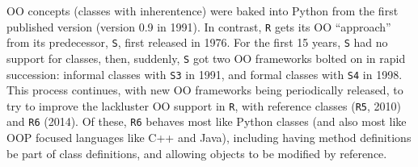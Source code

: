\documentclass[12pt, krantz2,]{krantz}
\theoremstyle{definition}
\theoremstyle{definition}
\theoremstyle{definition}
\newcommand{\1}{\mathbbm{1}}
\begin{document}
OO concepts (classes with inherentence) were baked into Python from the first
published version (version 0.9 in 1991). In contrast, \texttt{R} gets its OO ``approach''
from its predecessor, \texttt{S}, first released in 1976. For the first 15 years, \texttt{S}
had no support for classes, then, suddenly, \texttt{S} got two OO frameworks bolted on
in rapid succession: informal classes with \texttt{S3} in 1991, and formal classes with
\texttt{S4} in 1998. This process continues, with new OO frameworks being periodically
released, to try to improve the lackluster OO support in \texttt{R}, with reference
classes (\texttt{R5}, 2010) and \texttt{R6} (2014). Of these, \texttt{R6} behaves most like Python
classes (and also most like OOP focused languages like C++ and Java), including
having method definitions be part of class definitions, and allowing objects to
be modified by reference.



\backmatter
\printindex
\end{document}
